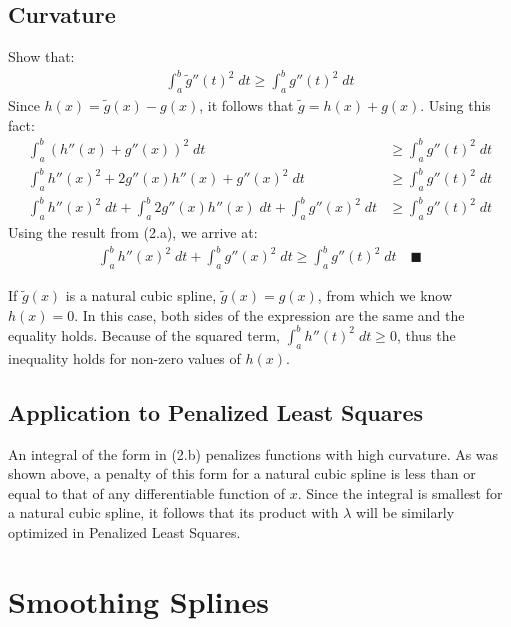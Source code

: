 \documentclass[a4paper]{article}
\begin{document}
\subsection{Curvature}
Show that:
\begin{align*}
  \int_a^b \widetilde{g}''(t)^2\;dt \ge \int_a^b g''(t)^2\;dt
\end{align*}
Since $h(x) = \widetilde{g}(x) - g(x)$, it follows that $\widetilde{g} = h(x) + g(x)$.
Using this fact:
\begin{align*}
  \int_a^b \left(h''(x) + g''(x)\right)^2\;dt &\ge \int_a^b g''(t)^2\;dt\\
  \int_a^b h''(x)^2 + 2g''(x)h''(x) + g''(x)^2\;dt &\ge \int_a^b g''(t)^2\;dt\\
  \int_a^b h''(x)^2\;dt + \int_a^b 2g''(x)h''(x)\;dt + \int_a^bg''(x)^2\;dt
    &\ge \int_a^b g''(t)^2\;dt
\end{align*}
Using the result from (2.a), we arrive at:
\begin{align*}
  \int_a^b h''(x)^2\;dt + \int_a^bg''(x)^2\;dt \ge \int_a^b g''(t)^2\;dt\quad\blacksquare
\end{align*}

If $\widetilde{g}(x)$ is a natural cubic spline,
$\widetilde{g}(x) = g(x)$, from which we know $h(x) = 0$.  In this case, both
sides of the expression are the same and the equality holds.
Because of the squared term, $\int_a^b h''(t)^2\;dt \ge 0$, thus the inequality
holds for non-zero values of $h(x)$.

\subsection{Application to Penalized Least Squares}
An integral of the form in (2.b) penalizes functions with high curvature.
As was shown above, a penalty of this form
for a natural cubic spline is less than or equal to that of any
differentiable function of $x$.  Since the integral is smallest for
a natural cubic spline, it follows that its product with $\lambda$ will be
similarly optimized in Penalized Least Squares.

\section{Smoothing Splines}
\end{document}
